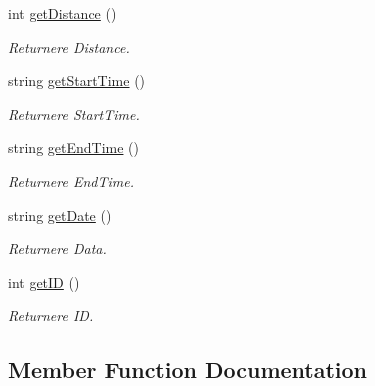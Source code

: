 \begin{DoxyCompactItemize}
int \hyperlink{classRideData_af72f4687f32b94d4f2d6e8cd59023b24}{get\+Distance} ()
\begin{DoxyCompactList}\small\item\em Returnere Distance. \end{DoxyCompactList}\item 
\mbox{\label{classRideData_abb4c61080f8bb39388508b36605f4723}} 
string \hyperlink{classRideData_abb4c61080f8bb39388508b36605f4723}{get\+Start\+Time} ()
\begin{DoxyCompactList}\small\item\em Returnere Start\+Time. \end{DoxyCompactList}\item 
\mbox{\label{classRideData_ab923d5c15bfe60ee62669b79bddbf1f5}} 
string \hyperlink{classRideData_ab923d5c15bfe60ee62669b79bddbf1f5}{get\+End\+Time} ()
\begin{DoxyCompactList}\small\item\em Returnere End\+Time. \end{DoxyCompactList}\item 
\mbox{\label{classRideData_a5bdfbd14490a8978865e0018c12d40d7}} 
string \hyperlink{classRideData_a5bdfbd14490a8978865e0018c12d40d7}{get\+Date} ()
\begin{DoxyCompactList}\small\item\em Returnere Data. \end{DoxyCompactList}\item 
\mbox{\label{classRideData_a75d2becd25de9eaef2e4fcbafc66b66f}} 
int \hyperlink{classRideData_a75d2becd25de9eaef2e4fcbafc66b66f}{get\+ID} ()
\begin{DoxyCompactList}\small\item\em Returnere ID. \end{DoxyCompactList}\end{DoxyCompactItemize}


\subsection{Member Function Documentation}
\mbox{\label{classRideData_a0290811130a17ab192e4c89068a48df9}} 
